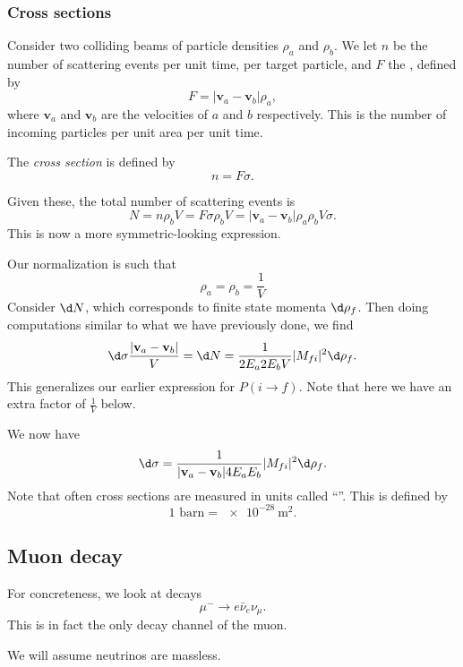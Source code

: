\documentclass[a4paper]{article}
\begin{document}
\subsubsection*{Cross sections}
Consider two colliding beams of particle densities $\rho_a$ and $\rho_b$. We let $n$ be the number of scattering events per unit time, per target particle, and $F$ the , defined by
\[
  F = |\mathbf{v}_a - \mathbf{v}_b| \rho_a,
\]
where $\mathbf{v}_a$ and $\mathbf{v}_b$ are the velocities of $a$ and $b$ respectively. This is the number of incoming particles per unit area per unit time.
\begin{defi}
  The \emph{cross section}\index{$\sigma$} is defined by
  \[
    n = F \sigma.
  \]
\end{defi}
Given these, the total number of scattering events is
\[
  N = n \rho_b V = F \sigma \rho_b V = |\mathbf{v}_a - \mathbf{v}_b| \rho_a \rho_b V \sigma.
\]
This is now a more symmetric-looking expression.

Our normalization is such that
\[
  \rho_a = \rho_b = \frac{1}{V}
\]
Consider $\d N$, which corresponds to finite state momenta $\d \rho_f$. Then doing computations similar to what we have previously done, we find
\[
  \d \sigma \frac{|\mathbf{v}_a - \mathbf{v}_b|}{V} = \d N = \frac{1}{2E_a 2 E_b V} |M_{fi}|^2 \d \rho_f.
\]
This generalizes our earlier expression for $P(i \to f)$. Note that here we have an extra factor of $\frac{1}{V}$ below.

We now have
\[
  \d \sigma = \frac{1}{|\mathbf{v}_a - \mathbf{v}_b|4E_a E_b} |M_{fi}|^2 \d \rho_f.
\]
Note that often cross sections are measured in units called ``''. This is defined by
\[
  1\text{ barn} = \SI{e-28}{\meter\squared}.
\]
\subsection{Muon decay}
For concreteness, we look at decays
\[
  \mu^- \to e \bar{\nu}_e \nu_\mu.
\]
This is in fact the only decay channel of the muon.
\begin{center}
\end{center}
We will assume neutrinos are massless.
\end{document}

